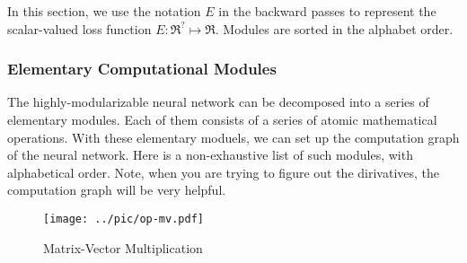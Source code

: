  In this section, we use the notation $E$ in the backward
 passes to represent the scalar-valued loss function
 $E: \Re^{?} \mapsto \Re$. Modules are sorted in the alphabet order.

 \subsubsection{Elementary Computational Modules}

 The highly-modularizable neural network can be decomposed into
 a series of elementary modules. Each of them consists of a series
 of atomic mathematical operations. With these elementary moduels,
 we can set up the computation graph of the neural network.
 Here is a non-exhaustive list of such modules, with alphabetical
 order. Note, when you are trying to figure out the dirivatives, the
 computation graph will be very helpful.

 \begin{figure}
\centering
    \texttt{[image: ../pic/op-mv.pdf]}
	\caption{Matrix-Vector Multiplication}
	\label{fig:op-mv}
 \end{figure}


